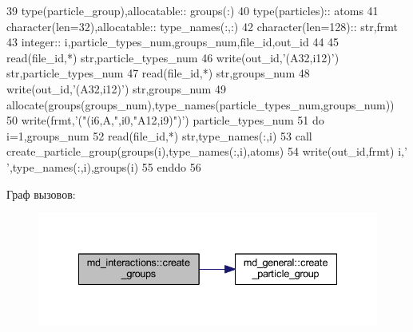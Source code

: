 \begin{DoxyCode}
39     \textcolor{keywordtype}{type}(particle\_group),\textcolor{keywordtype}{allocatable}:: groups(:)
40     \textcolor{keywordtype}{type}(particles):: atoms
41     \textcolor{keywordtype}{character(len=32)},\textcolor{keywordtype}{allocatable}:: type\_names(:,:)
42     \textcolor{keywordtype}{character(len=128)}:: str,frmt
43     \textcolor{keywordtype}{integer}:: i,particle\_types\_num,groups\_num,file\_id,out\_id
44     
45     \textcolor{keyword}{read}(file\_id,*) str,particle\_types\_num
46     \textcolor{keyword}{write}(out\_id,\textcolor{stringliteral}{'(A32,i12)'}) str,particle\_types\_num
47     \textcolor{keyword}{read}(file\_id,*) str,groups\_num
48     \textcolor{keyword}{write}(out\_id,\textcolor{stringliteral}{'(A32,i12)'}) str,groups\_num
49     \textcolor{keyword}{allocate}(groups(groups\_num),type\_names(particle\_types\_num,groups\_num))
50     \textcolor{keyword}{write}(frmt,\textcolor{stringliteral}{'("(i6,A,",i0,"A12,i9)")'}) particle\_types\_num
51     \textcolor{keywordflow}{do} i=1,groups\_num
52         \textcolor{keyword}{read}(file\_id,*) str,type\_names(:,i)
53         \textcolor{keyword}{call }create\_particle\_group(groups(i),type\_names(:,i),atoms)
54         \textcolor{keyword}{write}(out\_id,frmt) i,\textcolor{stringliteral}{' '},type\_names(:,i),groups(i)%
55 \textcolor{keywordflow}{    enddo}
56     
\end{DoxyCode}
Граф вызовов\+:\nopagebreak
\begin{figure}[H]
\begin{center}
\leavevmode
\includegraphics[width=335pt]{namespacemd__interactions_a52c7d3a0c8df2f15b75c8fef73ee795d_cgraph}
\end{center}
\end{figure}
\mbox{\label{namespacemd__interactions_ad655aab8b55d15d13e66769ae95ca229}} 
